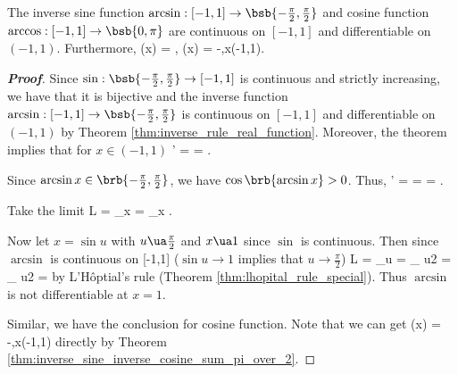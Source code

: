 \begin{theorem}
The inverse sine function $\arcsin:[-1,1]\to \bsb{-\frac{\pi}2,\frac{\pi}2}$ and cosine function $\arccos:[-1,1]\to \bsb{0,\pi}$ are continuous on $[-1,1]$ and differentiable on $(-1,1)$. Furthermore,
\be
{} \arcsin(x) = ,\qquad {} \arccos(x) = -,\qquad x\in (-1,1).
\ee
\end{theorem}

\begin{proof}[\bf Proof]
Since $\sin:\bsb{-\frac{\pi}2,\frac{\pi}2}\to [-1,1]$ is continuous and strictly increasing, we have that it is bijective and the inverse function $\arcsin:[-1,1]\to \bsb{-\frac{\pi}2,\frac{\pi}2}$ is continuous on $[-1,1]$ and differentiable on $(-1,1)$ by Theorem \ref{thm:inverse_rule_real_function}. Moreover, the theorem implies that for $x\in (-1,1)$
\be
{}' =  = .
\ee

Since $\arcsin x \in \brb{-\frac{\pi}2,\frac{\pi}2}$, we have $\cos\brb{\arcsin x}>0$. Thus,
\be
{}' =  =  = .
\ee




Take the limit
\be
L = \lim_{x}  =  \lim_{x} .
\ee

Now let $x=\sin u$ with $u\ua \frac{\pi}2$ and $x\ua 1$ since $\sin$ is continuous. Then since $\arcsin$ is continuous on [-1,1] ($\sin u\to 1$ implies that $u\to \frac{\pi}2$)
\be
L = \lim_{\sin u}  = \lim_{ u\to \frac{\pi}2 }  = \lim_{ u\to \frac{\pi}2 }  = \infty
\ee
by L'H\^optial's rule (Theorem \ref{thm:lhopital_rule_special}). Thus $\arcsin$ is not differentiable at $x=1$.

Similar, we have the conclusion for cosine function. Note that we can get
\be
{} \arccos(x) = -,\qquad x\in (-1,1)
\ee
directly by Theorem \ref{thm:inverse_sine_inverse_cosine_sum_pi_over_2}.
\end{proof}


